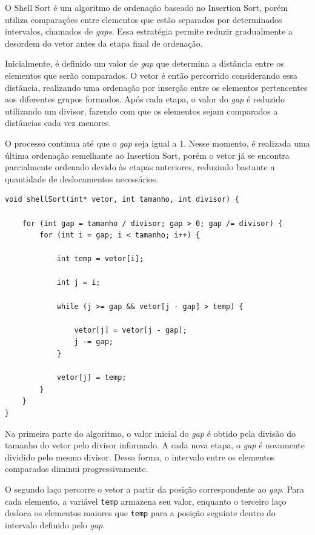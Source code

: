 \quad O Shell Sort é um algoritmo de ordenação baseado no Insertion Sort,
porém utiliza comparações entre elementos que estão separados por
determinados intervalos, chamados de \textit{gaps}. Essa estratégia
permite reduzir gradualmente a desordem do vetor antes da etapa final de
ordenação.

\quad Inicialmente, é definido um valor de \textit{gap} que determina a
distância entre os elementos que serão comparados. O vetor é então
percorrido considerando essa distância, realizando uma ordenação por
inserção entre os elementos pertencentes aos diferentes grupos formados.
Após cada etapa, o valor do \textit{gap} é reduzido utilizando um divisor,
fazendo com que os elementos sejam comparados a distâncias cada vez
menores.

\quad O processo continua até que o \textit{gap} seja igual a 1. Nesse
momento, é realizada uma última ordenação semelhante ao Insertion Sort,
porém o vetor já se encontra parcialmente ordenado devido às etapas
anteriores, reduzindo bastante a quantidade de deslocamentos necessários.

\begin{lstlisting}[caption={Implementação do Shell Sort}]
void shellSort(int* vetor, int tamanho, int divisor) {

    for (int gap = tamanho / divisor; gap > 0; gap /= divisor) {
        for (int i = gap; i < tamanho; i++) { 

            int temp = vetor[i]; 

            int j = i;

            while (j >= gap && vetor[j - gap] > temp) {

                vetor[j] = vetor[j - gap]; 
                j -= gap; 
            }

            vetor[j] = temp; 
        }
    }
}
\end{lstlisting}

\quad Na primeira parte do algoritmo, o valor inicial do \textit{gap} é
obtido pela divisão do tamanho do vetor pelo divisor informado. A cada
nova etapa, o \textit{gap} é novamente dividido pelo mesmo divisor. Dessa
forma, o intervalo entre os elementos comparados diminui
progressivamente.

\quad O segundo laço percorre o vetor a partir da posição correspondente
ao \textit{gap}. Para cada elemento, a variável \texttt{temp} armazena
seu valor, enquanto o terceiro laço desloca os elementos maiores que
\texttt{temp} para a posição seguinte dentro do intervalo definido pelo
\textit{gap}.

